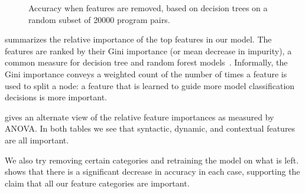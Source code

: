 \documentclass[conference]{IEEEtran}
\begin{document}
\begin{figure}
\caption{Accuracy when features are removed, based on decision trees on a
random subset of 20000 program pairs.}
\label{fig-removing-features}
\end{figure}

 summarizes the relative importance
of the top features in our model. The features are ranked by their
Gini importance (or mean decrease in impurity), a common measure
for decision tree and random forest models~\cite{FIXME}. Informally, the
Gini importance conveys a weighted count of the number of times a feature
is used to split a node: a feature that is learned to guide more model
classification decisions is more important.

 gives an alternate view of the relative feature importances
as measured by ANOVA. In both tables we see that syntactic, dynamic, and
contextual features are all important.

We also try removing certain categories and retraining the model on what is
left.  shows that there is a significant decrease in
accuracy in each case, supporting the claim that all our feature categories are
important.





\end{document}
